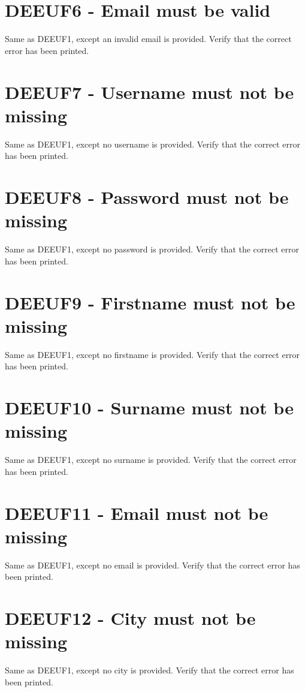 \documentclass{article}
\begin{document}
\section*{DEEUF6 - Email must be valid}

Same as DEEUF1, except an invalid email is provided.
Verify that the correct error has been printed.


\section*{DEEUF7 - Username must not be missing}

Same as DEEUF1, except no username is provided.
Verify that the correct error has been printed.

\section*{DEEUF8 - Password must not be missing}

Same as DEEUF1, except no password is provided.
Verify that the correct error has been printed.

\section*{DEEUF9 - Firstname must not be missing}

Same as DEEUF1, except no firstname is provided.
Verify that the correct error has been printed.

\section*{DEEUF10 - Surname must not be missing}

Same as DEEUF1, except no surname is provided.
Verify that the correct error has been printed.

\section*{DEEUF11 - Email must not be missing}

Same as DEEUF1, except no email is provided.
Verify that the correct error has been printed.

\section*{DEEUF12 - City must not be missing}

Same as DEEUF1, except no city is provided.
Verify that the correct error has been printed.
\end{document}
